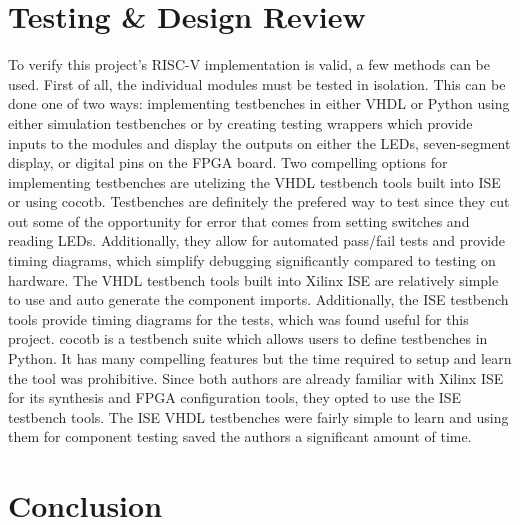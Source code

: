 \documentclass[lettersize,journal]{IEEEtran}
\begin{document}
\section{Testing \& Design Review}
To verify this project's RISC-V implementation is valid, a few methods can be used. First of all, the individual modules must be tested in isolation.
This can be done one of two ways: implementing testbenches in either VHDL or Python using either simulation testbenches or by creating testing wrappers which provide inputs to the modules and display the outputs on either the LEDs, seven-segment display, or digital pins on the FPGA board.
Two compelling options for implementing testbenches are utelizing the VHDL testbench tools built into ISE or using cocotb.
Testbenches are definitely the prefered way to test since they cut out some of the opportunity for error that comes from setting switches and reading LEDs.
Additionally, they allow for automated pass/fail tests and provide timing diagrams, which simplify debugging significantly compared to testing on hardware.
The VHDL testbench tools built into Xilinx ISE are relatively simple to use and auto generate the component imports.
Additionally, the ISE testbench tools provide timing diagrams for the tests, which was found useful for this project.
cocotb is a testbench suite which allows users to define testbenches in Python.
It has many compelling features but the time required to setup and learn the tool was prohibitive.
Since both authors are already familiar with Xilinx ISE for its synthesis and FPGA configuration tools, they opted to use the ISE testbench tools.
The ISE VHDL testbenches were fairly simple to learn and using them for component testing saved the authors a significant amount of time.

\section{Conclusion}
\color{red}{TBD}\color{black}
\end{document}
